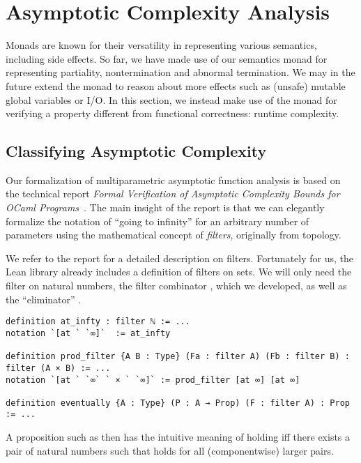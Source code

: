 \section{Asymptotic Complexity Analysis}
\label{sec:asymptotic}

Monads are known for their versatility in representing various semantics,
including side effects. So far, we have made use of our semantics monad for
representing partiality, \ie nontermination and abnormal termination. We may in
the future extend the monad to reason about more effects such as (unsafe) mutable global
variables or I/O. In this section, we instead make use of the monad for verifying a
property different from functional correctness: runtime complexity.

\subsection{Classifying Asymptotic Complexity}

Our formalization of multiparametric asymptotic function analysis is based on the technical
report \emph{Formal Verification of Asymptotic Complexity Bounds
for OCaml Programs}~\cite{gueneau}. The main insight of the report is that
we can elegantly formalize the notation of ``going to infinity'' for an
arbitrary number of parameters using the mathematical concept of \emph{filters},
originally from topology.

We refer to the report for a detailed description on
filters. Fortunately for us, the Lean library already includes
a definition of filters on sets. We will only need the filter  on
natural numbers, the filter combinator , which we developed,
as well as the ``eliminator'' .

\begin{verbatim}
definition at_infty : filter ℕ := ...
notation `[at ` `∞]`  := at_infty

definition prod_filter {A B : Type} (Fa : filter A) (Fb : filter B) : filter (A × B) := ...
notation `[at ` `∞` ` × ` `∞]` := prod_filter [at ∞] [at ∞]

definition eventually {A : Type} (P : A → Prop) (F : filter A) : Prop := ...
\end{verbatim}

A proposition such as  then has the intuitive meaning
of holding iff there exists a pair of natural numbers such that  holds
for all (componentwise) larger pairs.

